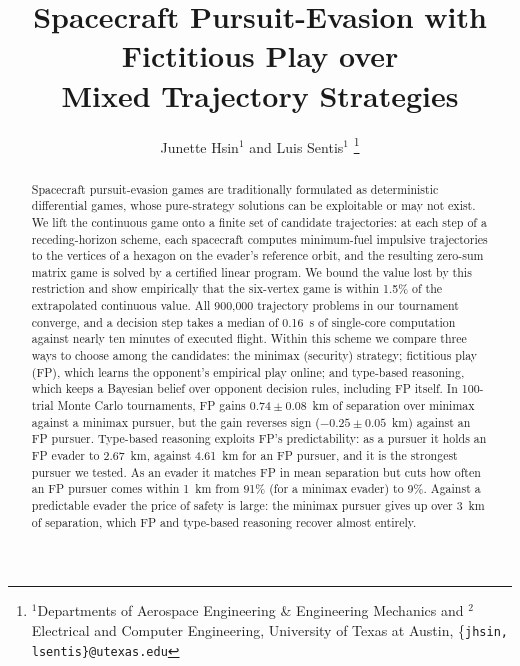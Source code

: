 \documentclass[letterpaper, 10 pt, conference]{ieeeconf}  %
\title{\LARGE \bf
Spacecraft Pursuit-Evasion with Fictitious Play over \\ Mixed Trajectory Strategies
}
\author{
Junette Hsin$^{1}$ and 
Luis Sentis$^{1}$ 
\thanks{$^{1}$Departments of Aerospace Engineering \& Engineering Mechanics and $^{2}$Electrical and Computer Engineering,
        University of Texas at Austin, \{{\tt\small jhsin, lsentis\}@utexas.edu}}%
}
\begin{document}
\maketitle 


\thispagestyle{empty}
\pagestyle{empty}


\begin{abstract}

Spacecraft pursuit-evasion games are traditionally formulated as deterministic differential games, whose pure-strategy solutions can be exploitable or may not exist. We lift the continuous game onto a finite set of candidate trajectories: at each step of a receding-horizon scheme, each spacecraft computes minimum-fuel impulsive trajectories to the vertices of a hexagon on the evader's reference orbit, and the resulting zero-sum matrix game is solved by a certified linear program. We bound the value lost by this restriction and show empirically that the six-vertex game is within 1.5\% of the extrapolated continuous value. All 900,000 trajectory problems in our tournament converge, and a decision step takes a median of 0.16~s of single-core computation against nearly ten minutes of executed flight. Within this scheme we compare three ways to choose among the candidates: the minimax (security) strategy; fictitious play (FP), which learns the opponent's empirical play online; and type-based reasoning, which keeps a Bayesian belief over opponent decision rules, including FP itself. In 100-trial Monte Carlo tournaments, FP gains $0.74 \pm 0.08$~km of separation over minimax against a minimax pursuer, but the gain reverses sign ($-0.25 \pm 0.05$~km) against an FP pursuer. Type-based reasoning exploits FP's predictability: as a pursuer it holds an FP evader to 2.67~km, against 4.61~km for an FP pursuer, and it is the strongest pursuer we tested. As an evader it matches FP in mean separation but cuts how often an FP pursuer comes within 1~km from 91\% (for a minimax evader) to 9\%. Against a predictable evader the price of safety is large: the minimax pursuer gives up over 3~km of separation, which FP and type-based reasoning recover almost entirely.

\end{abstract}

\end{document}
